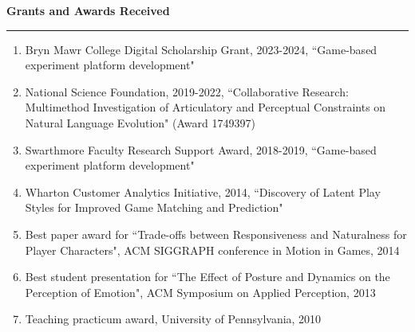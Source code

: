{\Large {\bf Grants and Awards Received}}
\vspace{0.1cm}
\hrule
\medskip

\begin{enumerate}[leftmargin=*]

\item Bryn Mawr College Digital Scholarship Grant, 2023-2024, ``Game-based experiment platform development"

\item National Science Foundation, 2019-2022, 
``Collaborative Research: Multimethod Investigation of Articulatory and Perceptual Constraints on Natural Language Evolution" (Award 1749397)

\item Swarthmore Faculty Research Support Award, 2018-2019, ``Game-based experiment platform development"

\item Wharton Customer Analytics Initiative, 2014, ``Discovery of Latent Play Styles for Improved Game Matching and Prediction"

\item Best paper award for ``Trade-offs between Responsiveness and Naturalness for Player Characters", ACM SIGGRAPH conference in Motion in Games, 2014

\item Best student presentation for ``The Effect of Posture and Dynamics on the Perception of Emotion", ACM Symposium on Applied Perception, 2013

\item Teaching practicum award, University of Pennsylvania, 2010
\end{enumerate}


